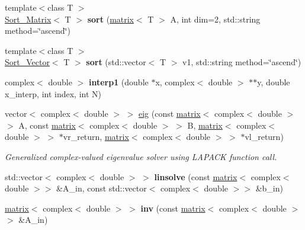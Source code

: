 \begin{DoxyCompactItemize}
\item 
\hypertarget{namespacekeycpp_a6862448bf6e09309e60a6ba7aa0caf9a}{{\footnotesize template$<$class T $>$ }\\\hyperlink{structkeycpp_1_1_sort___matrix}{Sort\-\_\-\-Matrix}$<$ T $>$ {\bfseries sort} (\hyperlink{classkeycpp_1_1matrix}{matrix}$<$ T $>$ A, int dim=2, std\-::string method=\char`\"{}ascend\char`\"{})}\label{namespacekeycpp_a6862448bf6e09309e60a6ba7aa0caf9a}

\item 
\hypertarget{namespacekeycpp_a1be4e97b99a996a01f428fd8ba048fb0}{{\footnotesize template$<$class T $>$ }\\\hyperlink{structkeycpp_1_1_sort___vector}{Sort\-\_\-\-Vector}$<$ T $>$ {\bfseries sort} (std\-::vector$<$ T $>$ v1, std\-::string method=\char`\"{}ascend\char`\"{})}\label{namespacekeycpp_a1be4e97b99a996a01f428fd8ba048fb0}

\item 
\hypertarget{namespacekeycpp_a6c9e2412b8c1f306d09e7dc1214c4fb9}{complex$<$ double $>$ {\bfseries interp1} (double $\ast$x, complex$<$ double $>$ $\ast$$\ast$y, double x\-\_\-interp, int index, int N)}\label{namespacekeycpp_a6c9e2412b8c1f306d09e7dc1214c4fb9}

\item 
vector$<$ complex$<$ double $>$ $>$ \hyperlink{namespacekeycpp_a190640edb8e634de02d302d94a29ee17}{eig} (const \hyperlink{classkeycpp_1_1matrix}{matrix}$<$ complex$<$ double $>$ $>$ A, const \hyperlink{classkeycpp_1_1matrix}{matrix}$<$ complex$<$ double $>$ $>$ B, \hyperlink{classkeycpp_1_1matrix}{matrix}$<$ complex$<$ double $>$ $>$ $\ast$vr\-\_\-return, \hyperlink{classkeycpp_1_1matrix}{matrix}$<$ complex$<$ double $>$ $>$ $\ast$vl\-\_\-return)
\begin{DoxyCompactList}\small\item\em Generalized complex-\/valued eigenvalue solver using L\-A\-P\-A\-C\-K function call. \end{DoxyCompactList}\item 
\hypertarget{namespacekeycpp_acea0bb8f128ef0cdf55a79c50ceccb83}{std\-::vector$<$ complex$<$ double $>$ $>$ {\bfseries linsolve} (const \hyperlink{classkeycpp_1_1matrix}{matrix}$<$ complex$<$ double $>$$>$ \&A\-\_\-in, const std\-::vector$<$ complex$<$ double $>$$>$ \&b\-\_\-in)}\label{namespacekeycpp_acea0bb8f128ef0cdf55a79c50ceccb83}

\item 
\hypertarget{namespacekeycpp_ac9cabca49e9650ae8b5aadf5ee2f7f4e}{\hyperlink{classkeycpp_1_1matrix}{matrix}$<$ complex$<$ double $>$ $>$ {\bfseries inv} (const \hyperlink{classkeycpp_1_1matrix}{matrix}$<$ complex$<$ double $>$$>$ \&A\-\_\-in)}\label{namespacekeycpp_ac9cabca49e9650ae8b5aadf5ee2f7f4e}

\end{DoxyCompactItemize}


